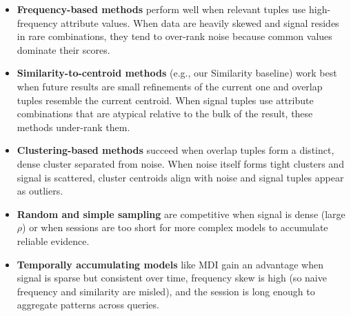\begin{itemize} [leftmargin=1em, topsep=0pt, itemsep=0pt, parsep=0pt]
  \item \textbf{Frequency-based methods} perform well when relevant tuples use high-frequency attribute values. When data are heavily skewed and signal resides in rare combinations, they tend to over-rank noise because common values dominate their scores.

  \item \textbf{Similarity-to-centroid methods} (e.g., our Similarity baseline) work best when future results are small refinements of the current one and overlap tuples resemble the current centroid. When signal tuples use attribute combinations that are atypical relative to the bulk of the result, these methods under-rank them.

  \item \textbf{Clustering-based methods} succeed when overlap tuples form a distinct, dense cluster separated from noise. When noise itself forms tight clusters and signal is scattered, cluster centroids align with noise and signal tuples appear as outliers.

  \item \textbf{Random and simple sampling} are competitive when signal is dense (large $\rho$) or when sessions are too short for more complex models to accumulate reliable evidence.

  \item \textbf{Temporally accumulating models} like MDI gain an advantage when signal is sparse but consistent over time, frequency skew is high (so naive frequency and similarity are misled), and the session is long enough to aggregate patterns across queries.
\end{itemize}



